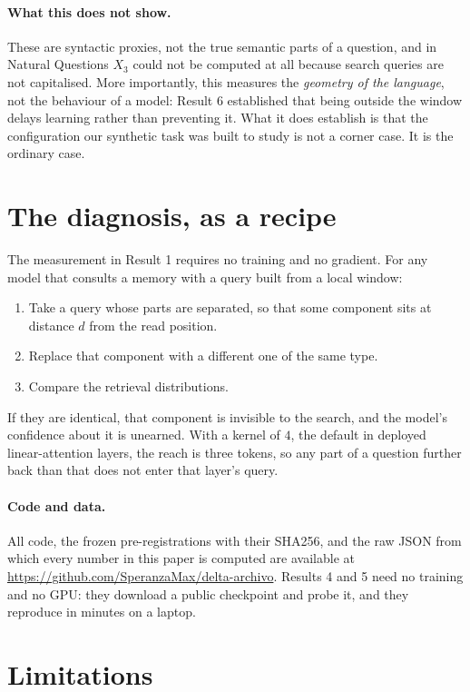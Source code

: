 \documentclass[11pt,a4paper]{article}
\begin{document}
\paragraph{What this does not show.} These are syntactic proxies, not the true semantic parts of a
question, and in Natural Questions $X_3$ could not be computed at all because search queries are not
capitalised. More importantly, this measures the \emph{geometry of the language}, not the behaviour of
a model: Result 6 established that being outside the window delays learning rather than preventing it.
What it does establish is that the configuration our synthetic task was built to study is not a corner
case. It is the ordinary case.


\section{The diagnosis, as a recipe}

The measurement in Result 1 requires no training and no gradient. For any model that consults a memory
with a query built from a local window:

\begin{enumerate}
\item Take a query whose parts are separated, so that some component sits at distance $d$ from the read
position.
\item Replace that component with a different one of the same type.
\item Compare the retrieval distributions.
\end{enumerate}

If they are identical, that component is invisible to the search, and the model's confidence about it
is unearned. With a kernel of $4$, the default in deployed linear-attention layers, the reach is three
tokens, so any part of a question further back than that does not enter that layer's query.

\paragraph{Code and data.} All code, the frozen pre-registrations with their SHA256, and the raw JSON
from which every number in this paper is computed are available at
\url{https://github.com/SperanzaMax/delta-archivo}. Results 4 and 5 need no training and no GPU: they
download a public checkpoint and probe it, and they reproduce in minutes on a laptop.

\section{Limitations}
\end{document}
